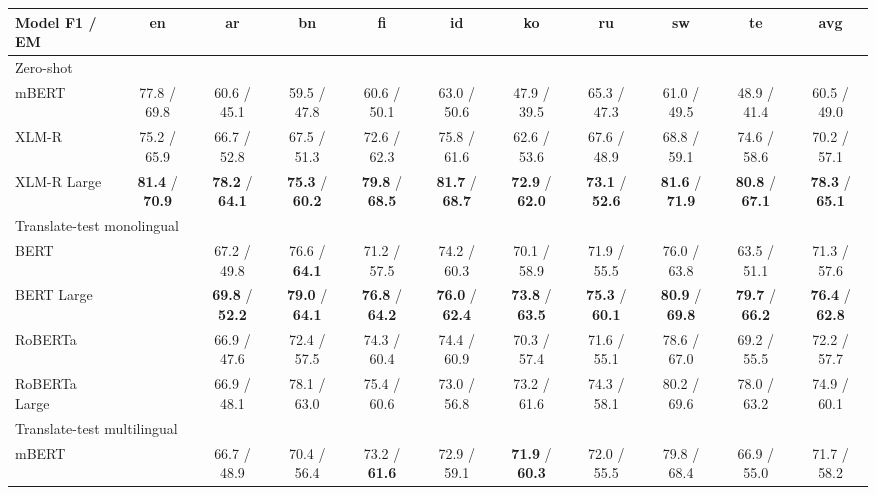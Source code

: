 \documentclass[11pt]{article}
\begin{document}
\begin{table*}[!ht]
    \centering
    \begin{adjustbox}{max width=\textwidth}
    \begin{tabular}{l|ccccccccc|c}
        \toprule
        Model F1 / EM & en & ar & bn & fi & id & ko & ru & sw & te & avg \\
        \midrule
        \multicolumn{11}{l}{Zero-shot} \\
        \midrule
        mBERT & 77.8 / 69.8 & 60.6 / 45.1 & 59.5 / 47.8 & 60.6 / 50.1 & 63.0 / 50.6 & 47.9 / 39.5 & 65.3 / 47.3 & 61.0 / 49.5 & 48.9 / 41.4 & 60.5 / 49.0  \\
        XLM-R & 75.2 / 65.9 & 66.7 / 52.8 & 67.5 / 51.3 & 72.6 / 62.3 & 75.8 / 61.6 & 62.6 / 53.6 & 67.6 / 48.9 & 68.8 / 59.1 & 74.6 / 58.6 & 70.2 / 57.1  \\
        XLM-R Large & \textbf{81.4} / \textbf{70.9} & \textbf{78.2} / \textbf{64.1} & \textbf{75.3} / \textbf{60.2} & \textbf{79.8} / \textbf{68.5} & \textbf{81.7} / \textbf{68.7} & \textbf{72.9} / \textbf{62.0} & \textbf{73.1} / \textbf{52.6} & \textbf{81.6} / \textbf{71.9} & \textbf{80.8} / \textbf{67.1} & \textbf{78.3} / \textbf{65.1}\\
        \midrule
        \multicolumn{11}{l}{Translate-test monolingual} \\
        \midrule
        BERT & ~ & 67.2 / 49.8 & 76.6 / \textbf{64.1} & 71.2 / 57.5 & 74.2 / 60.3 & 70.1 / 58.9 & 71.9 / 55.5 & 76.0 / 63.8 & 63.5 / 51.1 & 71.3 / 57.6 \\
        BERT Large & ~ & \textbf{69.8} / \textbf{52.2} & \textbf{79.0} / \textbf{64.1} & \textbf{76.8} / \textbf{64.2} & \textbf{76.0} / \textbf{62.4} & \textbf{73.8} / \textbf{63.5} & \textbf{75.3} / \textbf{60.1} & \textbf{80.9} / \textbf{69.8} & \textbf{79.7} / \textbf{66.2} & \textbf{76.4} / \textbf{62.8} \\
        RoBERTa & ~ & 66.9 / 47.6 & 72.4 / 57.5 & 74.3 / 60.4 & 74.4 / 60.9 & 70.3 / 57.4 & 71.6 / 55.1 & 78.6 / 67.0 & 69.2 / 55.5 & 72.2 / 57.7 \\
        RoBERTa Large & ~ & 66.9 / 48.1 & 78.1 / 63.0 & 75.4 / 60.6 & 73.0 / 56.8 & 73.2 / 61.6 & 74.3 / 58.1 & 80.2 / 69.6 & 78.0 / 63.2 & 74.9 / 60.1\\
        \midrule
        \multicolumn{11}{l}{Translate-test multilingual} \\
        \midrule
        mBERT & ~ & 66.7 / 48.9 & 70.4 / 56.4 & 73.2 / \textbf{61.6} & 72.9 / 59.1 & \textbf{71.9} / \textbf{60.3} & 72.0 / 55.5 & 79.8 / 68.4 & 66.9 / 55.0 & 71.7 / 58.2 \\

\end{tabular}
\end{adjustbox}
\end{table*}
\end{document}
